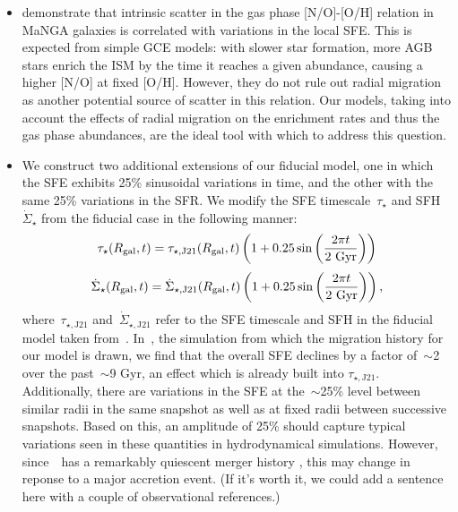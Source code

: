 \documentclass[ms.tex]{subfiles}
\begin{document}
\begin{itemize} 
	\item \citet{Schaefer2020} demonstrate that intrinsic scatter in the gas 
	phase [N/O]-[O/H] relation in MaNGA galaxies is correlated with variations 
	in the local SFE. 
	This is expected from simple GCE models: with slower star formation, 
	more AGB stars enrich the ISM by the time it reaches a given abundance, 
	causing a higher [N/O] at fixed [O/H]. 
	However, they do not rule out radial migration as another potential source 
	of scatter in this relation. 
	Our models, taking into account the effects of radial migration on the 
	enrichment rates and thus the gas phase abundances, are the ideal tool 
	with which to address this question. 

	\item We construct two additional extensions of our fiducial model, one 
	in which the SFE exhibits 25\% sinusoidal variations in time, and the other 
	with the same 25\% variations in the SFR. 
	We modify the SFE timescale~$\tau_\star$ and SFH~$\dot{\Sigma}_\star$ from 
	the fiducial case in the following manner: 
	\begin{equation} 
	\tau_\star(R_\text{gal}, t) = \tau_{\star,\text{J21}}(R_\text{gal}, t)\left(1 + 0.25\sin 
	\left(\frac{2\pi t}{2\text{ Gyr}}\right)\right)
	\end{equation} 
	\begin{equation} 
	\dot{\Sigma}_\star(R_\text{gal}, t) = \dot{\Sigma}_{\star,\text{J21}}(R_\text{gal}, t) 
	\left(1 + 0.25\sin \left(\frac{2\pi t}{2\text{ Gyr}}\right)\right), 
	\end{equation} 
	where~$\tau_{\star,\text{J21}}$ and~$\dot{\Sigma}_{\star,\text{J21}}$ refer 
	to the SFE timescale and SFH in the fiducial model taken 
	from~\citet{Johnson2021}. 
	In~\hsim, the simulation from which the migration history for our model is
	drawn, we find that the overall SFE declines by a factor of~$\sim$2 over
	the past~$\sim$9 Gyr, an effect which is already built into
	$\tau_{\star,\text{J21}}$.
	Additionally, there are variations in the SFE at the~$\sim$25\% level
	between similar radii in the same snapshot as well as at fixed radii 
	between successive snapshots.
	Based on this, an amplitude of 25\% should capture typical variations seen
	in these quantities in hydrodynamical simulations.
	However, since~\hsim~has a remarkably quiescent merger history 
	\citep{Zolotov2012}, this may change in reponse to a major accretion event.
	{\color{red} (If it's worth it, we could add a sentence here with a couple
	of observational references.)}


\end{itemize}
\end{document}
